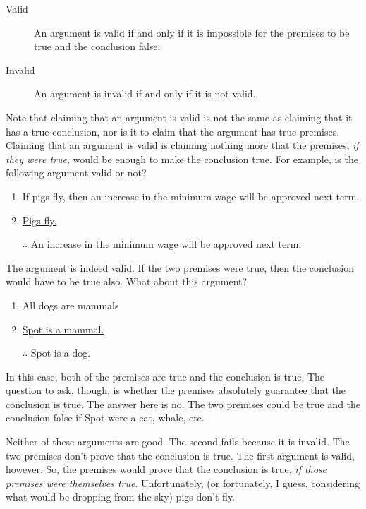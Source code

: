 \begin{description}
\item [Valid] An argument is valid if and only if it is impossible for the premises to be true and the conclusion false.
\item [Invalid] An argument is invalid if and only if it is not valid.
\end{description}

Note that claiming that an argument is valid is not the same as claiming that it has a true conclusion, nor is it to claim that the argument has true premises. Claiming that an argument is valid is claiming nothing more that the premises, \emph{if they were true}, would be enough to make the conclusion true. For example, is the following argument valid or not?


\begin{enumerate}
\item If pigs fly, then an increase in the minimum wage will be approved next term.
\item \underline{Pigs fly.}
\item [$\therefore$] An increase in the minimum wage will be approved next term.
\end{enumerate}


The argument is indeed valid. If the two premises were true, then the
conclusion would have to be true also. What about this argument?

\begin{enumerate}
\item All dogs are mammals 
\item \underline{Spot is a mammal.}
\item [$\therefore$] Spot is a dog.
\end{enumerate}

In this case, both of the premises are true and the conclusion is true. The question to ask, though, is whether the premises absolutely guarantee that the conclusion is true. The answer here is no. The two premises could be true and the conclusion false if Spot were a cat, whale, etc.

Neither of these arguments are good. The second fails because it is invalid. The two premises don't prove that the conclusion is true. The first argument is valid, however. So, the premises would prove that the conclusion is true, \emph{if those premises were themselves true}. Unfortunately, (or fortunately, I guess, considering what would be dropping from the sky) pigs don't fly.

